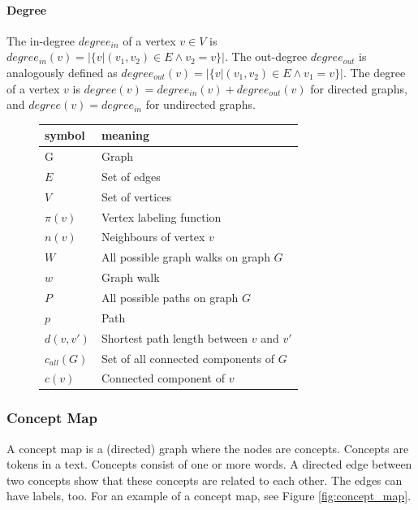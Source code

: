 \paragraph{Degree}
The in-degree $degree_{in}$ of a vertex $v \in V$ is $degree_{in}(v) = |\{v | (v_1, v_2) \in E \land v_2 = v\}|$.
The out-degree $degree_{out}$ is analogously defined as $degree_{out}(v) = |\{v | (v_1, v_2) \in E \land v_1 = v\}|$.
The degree of a vertex $v$ is $degree(v) = degree_{in}(v) + degree_{out}(v)$ for directed graphs, and $degree(v) = degree_{in}$ for undirected graphs.

\begin{figure}[ht]
\centering
\begin{tabular}{ll}
symbol &  meaning \\
\midrule
G & Graph \\
$E$ & Set of edges \\
$V$ & Set of vertices \\
$\pi(v)$ & Vertex labeling function \\
$n(v)$ & Neighbours of vertex $v$ \\
$W$ & All possible graph walks on graph $G$ \\
$w$ & Graph walk \\
$P$ & All possible paths on graph $G$ \\
$p$ & Path \\
$d(v, v')$ & Shortest path length between $v$ and $v'$ \\
$c_{all}(G)$ & Set of all connected components of $G$ \\
$c(v)$ & Connected component of $v$ \\
\end{tabular}
\end{figure}

\subsubsection{Concept Map}
A concept map is a (directed) graph where the nodes are concepts.
Concepts are tokens in a text.
Concepts consist of one or more words.
A directed edge between two concepts show that these concepts are related to each other. The edges can have labels, too.
For an example of a concept map, see Figure \ref{fig:concept_map}.

